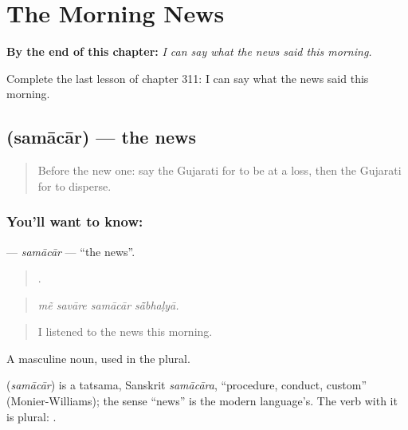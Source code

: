 
\chapter{The Morning News}
\label{ch:gu-the-morning-news}

\begin{chapteropening}
\textbf{By the end of this chapter:} \emph{I can say what the news said this morning.}

Complete the last lesson of chapter 311: I can say what the news said this morning.
\end{chapteropening}

\section[\texorpdfstring{\gu{સમાચાર} (samācār)}{સમાચાર (samācār)}]{ (samācār) — the news}

\label{lesson:GU-C311-samacar}



\begin{quote}
Before the new one: say the Gujarati for to be at a loss, then the Gujarati for to disperse.
\end{quote}

\subsection*{You'll want to know: }
\textbf{} — \emph{samācār} — \textquotedblleft{}the news\textquotedblright{}.

\begin{quote}
   .
\end{quote}

\begin{quote}
\emph{mẽ savāre samācār sā̃bhaḷyā.}
\end{quote}

\begin{quote}
I listened to the news this morning.
\end{quote}

A masculine noun, used in the plural.

\begin{cousinweb}
\textbf{} (\emph{samācār}) is a tatsama, Sanskrit \emph{samācāra}, \textquotedblleft{}procedure, conduct, custom\textquotedblright{} (Monier-Williams); the sense \textquotedblleft{}news\textquotedblright{} is the modern language's. The verb with it is plural: \textbf{ }.
\end{cousinweb}

